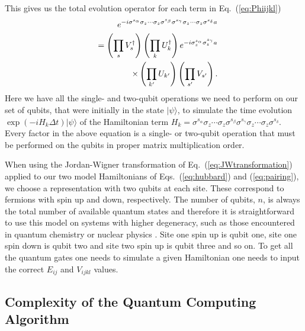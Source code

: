 This gives us the total evolution operator for each term in
Eq.~(\ref{eq:Phiijkl})  
\begin{eqnarray}
&&e^{-i\sigma^{s_\alpha} \sigma_z \cdots \sigma_z
\sigma^{s_\beta} \sigma^{s_\gamma} \sigma_z \cdots \sigma_z
\sigma^{s_\delta} a} \notag \\
&&=\left(\prod_s V_s^\dag \right)\left(\prod_k U_k^\dag \right)
e^{-i \sigma_z^{s_\alpha}\sigma_z^{s_\gamma}a} \notag\\
&&\times\left(\prod_{k^\prime}
U_{k^\prime}\right)
\left(\prod_{s^\prime}
V_{s^\prime}\right).
\end{eqnarray}
Here we have all the single- and two-qubit operations we need to
perform on our set of qubits, that were initially in the state
$|\psi\rangle$, to simulate the time evolution $\exp(-iH_k\Delta
t)|\psi\rangle$ of the Hamiltonian term $H_k= \sigma^{s_\alpha} \sigma_z \cdots \sigma_z
\sigma^{s_\beta} \sigma^{s_\gamma} \sigma_z \cdots \sigma_z
\sigma^{s_\delta}$. Every factor in the above equation is a single- or
two-qubit operation that must be performed on the qubits in proper
matrix multiplication order.

When using the Jordan-Wigner transformation of
Eq.~(\ref{eq:JWtransformation}) applied to our two model Hamiltonians of
Eqs.~(\ref{eq:hubbard}) and (\ref{eq:pairing}), we choose a representation with two qubits at each site. These
correspond to fermions with spin up and down, respectively.
The number of qubits, $n$, is always the total number of available
quantum states and therefore
it is straightforward to use this model on systems with higher degeneracy, such
as those encountered in quantum chemistry \cite{helgaker} or nuclear physics \cite{caurier2005}. 
Site one spin up is qubit one, site one spin
down is qubit two and site two spin up is qubit three and so on.
To get all the quantum gates one needs to simulate a given Hamiltonian
one needs to input the correct $E_{ij}$ and $V_{ijkl}$ values. 



\subsection{Complexity of the Quantum Computing Algorithm}
\label{sec:complexityOfFermionicSimulator}

